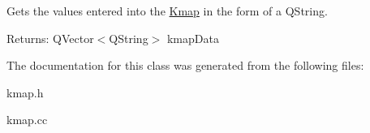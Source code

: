 Gets the values entered into the \hyperlink{classKmap}{Kmap} in the form of a QString. \begin{Desc}
\item[Returns:]QVector$<$QString$>$ kmapData \end{Desc}


The documentation for this class was generated from the following files:\begin{CompactItemize}
\item 
kmap.h\item 
kmap.cc\end{CompactItemize}
